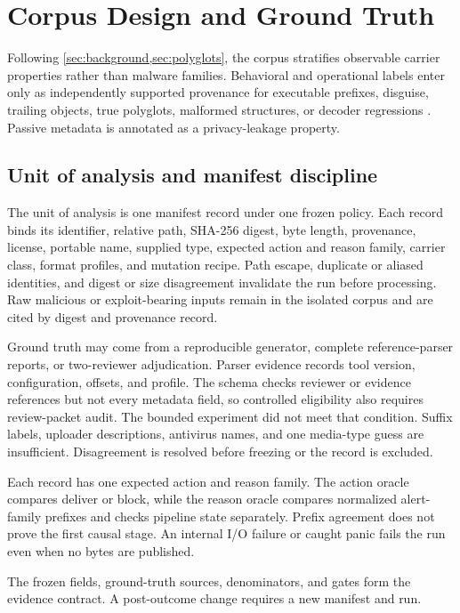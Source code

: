 \section{Corpus Design and Ground Truth}
\label{sec:corpus}

Following \cref{sec:background,sec:polyglots}, the corpus stratifies observable
carrier properties rather than malware families. Behavioral and operational
labels enter only as independently supported provenance for executable prefixes,
disguise, trailing objects, true polyglots, malformed structures, or decoder
regressions \cite{nist80083}. Passive metadata is annotated as a privacy-leakage
property.

\subsection{Unit of analysis and manifest discipline}
\label{subsec:corpus-unit}

The unit of analysis is one manifest record under one frozen policy. Each record
binds its identifier, relative path, SHA-256 digest, byte length, provenance,
license, portable name, supplied type, expected action and reason family,
carrier class, format profiles, and mutation recipe. Path escape, duplicate or
aliased identities, and digest or size disagreement invalidate the run before
processing. Raw malicious or exploit-bearing inputs remain in the isolated
corpus and are cited by digest and provenance record.

Ground truth may come from a reproducible generator, complete reference-parser
reports, or two-reviewer adjudication. Parser evidence records tool version,
configuration, offsets, and profile. The schema checks reviewer or evidence
references but not every metadata field, so controlled eligibility also
requires review-packet audit. The bounded experiment did not meet that
condition. Suffix labels, uploader descriptions, antivirus names, and one
media-type guess are insufficient. Disagreement is resolved before freezing or
the record is excluded.

Each record has one expected action and reason family. The action oracle compares
deliver or block, while the reason oracle compares normalized alert-family
prefixes and checks pipeline state separately. Prefix agreement does not prove
the first causal stage. An internal I/O failure or caught panic fails the run
even when no bytes are published.

The frozen fields, ground-truth sources, denominators, and gates form the
evidence contract. A post-outcome change requires a new manifest and run.

